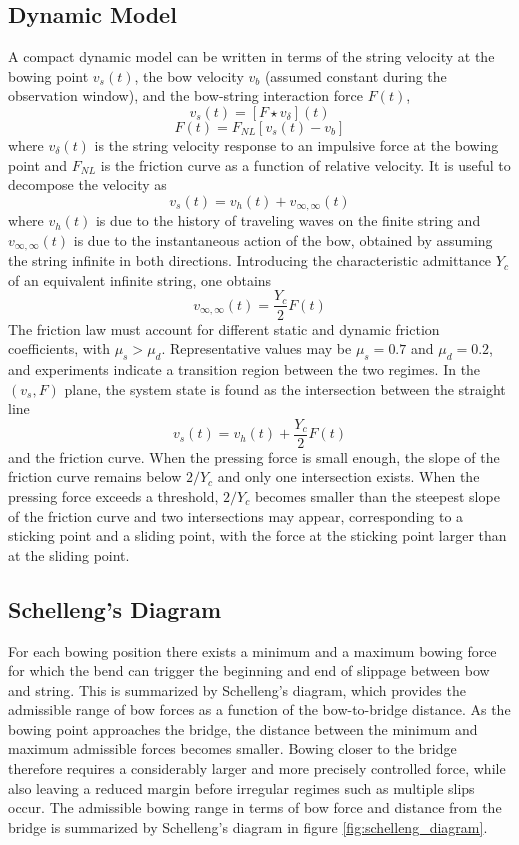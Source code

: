 \subsection{Dynamic Model}

A compact dynamic model can be written in terms of the string velocity at the bowing point \( v_s(t) \), the bow velocity \( v_b \) (assumed constant during the observation window), and the bow-string interaction force \( F(t) \),
\[
v_s(t) = \left[F \star v_{\delta}\right](t)
\]
\[
F(t) = F_{NL}\!\left[v_s(t) - v_b\right]
\]
where \( v_{\delta}(t) \) is the string velocity response to an impulsive force at the bowing point and \( F_{NL} \) is the friction curve as a function of relative velocity. It is useful to decompose the velocity as
\[
v_s(t) = v_h(t) + v_{\infty,\infty}(t)
\]
where \( v_h(t) \) is due to the history of traveling waves on the finite string and \( v_{\infty,\infty}(t) \) is due to the instantaneous action of the bow, obtained by assuming the string infinite in both directions. Introducing the characteristic admittance \( Y_c \) of an equivalent infinite string, one obtains
\[
v_{\infty,\infty}(t) = \frac{Y_c}{2}F(t)
\]
The friction law must account for different static and dynamic friction coefficients, with \( \mu_s>\mu_d \). Representative values may be \( \mu_s = 0.7 \) and \( \mu_d = 0.2 \), and experiments indicate a transition region between the two regimes. In the \( (v_s,F) \) plane, the system state is found as the intersection between the straight line
\[
v_s(t) = v_h(t) + \frac{Y_c}{2}F(t)
\]
and the friction curve. When the pressing force is small enough, the slope of the friction curve remains below \( 2/Y_c \) and only one intersection exists. When the pressing force exceeds a threshold, \( 2/Y_c \) becomes smaller than the steepest slope of the friction curve and two intersections may appear, corresponding to a sticking point and a sliding point, with the force at the sticking point larger than at the sliding point.

\subsection{Schelleng's Diagram}

For each bowing position there exists a minimum and a maximum bowing force for which the bend can trigger the beginning and end of slippage between bow and string. This is summarized by Schelleng's diagram, which provides the admissible range of bow forces as a function of the bow-to-bridge distance. As the bowing point approaches the bridge, the distance between the minimum and maximum admissible forces becomes smaller. Bowing closer to the bridge therefore requires a considerably larger and more precisely controlled force, while also leaving a reduced margin before irregular regimes such as multiple slips occur. The admissible bowing range in terms of bow force and distance from the bridge is summarized by Schelleng's diagram in figure \ref{fig:schelleng_diagram}.

